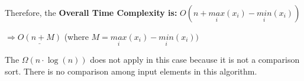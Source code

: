 \documentclass[letterpaper,11pt]{article}
\begin{document}
Therefore, the \textbf{Overall Time Complexity is:} $O(n + \underset{i}{max} (x_i) - \underset{i}{min} (x_i))$

\tabto{200pt} $\Rightarrow \underline{O(n+M)}$ (where $M = \underset{i}{max} (x_i) - \underset{i}{min} (x_i))$

The $\Omega(n \cdot \log(n))$ does not apply in this case because it is not a comparison sort.
There is no comparison among input elements in this algorithm. 
\end{document}
